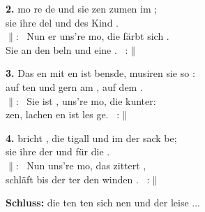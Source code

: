 \textbf{2.} mo  re de und sie zen zumen im ; \\
sie  ihre del und des Kind . \\
$\|$:~ Nun er uns're mo, die  färbt sich . \\
Sie  an den beln und  eine . ~:$\|$

\noindent\textbf{3.} Das en mit en ist bensde, musiren  sie so : \\
auf ten und gern am , auf dem . \\
$\|$:~ Sie ist , uns're mo, die  kunter: \\
zen, lachen en ist les ge. ~:$\|$

\noindent\textbf{4.}  bricht , die tigall  und im  der sack be; \\
sie  ihre der und  für die . \\
$\|$:~ Nun  uns're mo, das  zittert , \\
 schläft bis der ter den winden . ~:$\|$

\noindent\textbf{Schluss:}  die ten ten sich nen und der  leise ...
